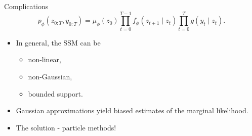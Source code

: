 \documentclass[10pt, aspectratio=1610]{beamer}
\begin{document}
    \begin{frame}{Complications}
      \begin{equation}
        p_{\phi}(z_{0:T}, y_{0:T}) = \mu_{\phi}(z_0) \prod_{t=0}^{T-1} f_{\phi}(z_{t+1} \mid z_t) \prod_{t=0}^T g(y_t \mid z_t).
      \end{equation}
      \begin{itemize}
        \setlength\itemsep{1em}
        \item<1-> In general, the SSM can be
        \begin{itemize}
          \item non-linear,
          \item non-Gaussian,
          \item bounded support.
        \end{itemize}
      \item<2-> Gaussian approximations yield biased estimates of the marginal likelihood.
      \item<3-> The solution - particle methods!
      \end{itemize}
    \end{frame}
\end{document}
